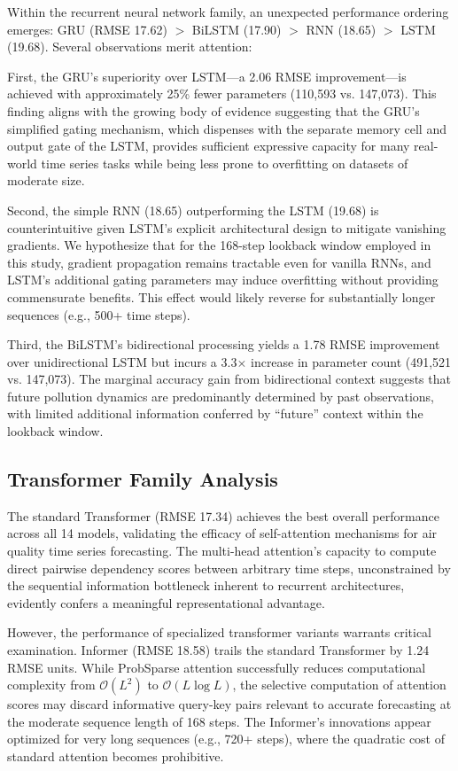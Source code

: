 \documentclass[conference]{IEEEtran}
\begin{document}
Within the recurrent neural network family, an unexpected performance ordering emerges: GRU (RMSE 17.62) $>$ BiLSTM (17.90) $>$ RNN (18.65) $>$ LSTM (19.68). Several observations merit attention:

First, the GRU's superiority over LSTM---a 2.06 RMSE improvement---is achieved with approximately 25\% fewer parameters (110,593 vs. 147,073). This finding aligns with the growing body of evidence suggesting that the GRU's simplified gating mechanism, which dispenses with the separate memory cell and output gate of the LSTM, provides sufficient expressive capacity for many real-world time series tasks while being less prone to overfitting on datasets of moderate size.

Second, the simple RNN (18.65) outperforming the LSTM (19.68) is counterintuitive given LSTM's explicit architectural design to mitigate vanishing gradients. We hypothesize that for the 168-step lookback window employed in this study, gradient propagation remains tractable even for vanilla RNNs, and LSTM's additional gating parameters may induce overfitting without providing commensurate benefits. This effect would likely reverse for substantially longer sequences (e.g., 500+ time steps).

Third, the BiLSTM's bidirectional processing yields a 1.78 RMSE improvement over unidirectional LSTM but incurs a 3.3$\times$ increase in parameter count (491,521 vs. 147,073). The marginal accuracy gain from bidirectional context suggests that future pollution dynamics are predominantly determined by past observations, with limited additional information conferred by ``future'' context within the lookback window.

\subsection{Transformer Family Analysis}

The standard Transformer (RMSE 17.34) achieves the best overall performance across all 14 models, validating the efficacy of self-attention mechanisms for air quality time series forecasting. The multi-head attention's capacity to compute direct pairwise dependency scores between arbitrary time steps, unconstrained by the sequential information bottleneck inherent to recurrent architectures, evidently confers a meaningful representational advantage.

However, the performance of specialized transformer variants warrants critical examination. Informer (RMSE 18.58) trails the standard Transformer by 1.24 RMSE units. While ProbSparse attention successfully reduces computational complexity from $\mathcal{O}(L^{2})$ to $\mathcal{O}(L \log L)$, the selective computation of attention scores may discard informative query-key pairs relevant to accurate forecasting at the moderate sequence length of 168 steps. The Informer's innovations appear optimized for very long sequences (e.g., 720+ steps), where the quadratic cost of standard attention becomes prohibitive.
\end{document}
